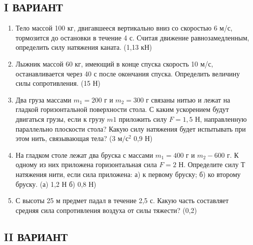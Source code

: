 \documentclass[a5paper, 10pt]{diss_4}
\renewcommand{\'}{\,'}
\begin{document}
\subsection{I ВАРИАНТ}
\begin{enumerate}

  \item Тело массой 100 кг, двигавшееся вертикально вниз со скоростью 6 м/с, тормозится до остановки в течение 4 с. Считая движение равнозамедленным, определить силу натяжения каната. (1,13 кН)

  \item Лыжник массой 60 кг, имеющий в конце спуска скорость 10 м/с, останавливается через 40 с после окончания спуска. Определить величину силы сопротивления. (15 Н)

  \item Два груза массами $m_1 = 20$0 г и $m_2 = 300$ г связаны нитью и лежат на гладкой горизонтальной поверхности стола. С каким ускорением будут двигаться грузы, если к грузу $m1$ приложить силу $F = 1,5$ Н, направленную параллельно плоскости стола? Какую силу натяжения будет испытывать при этом нить, связывающая тела? (3 $м/с^2$     0,9 Н)


  \item На гладком столе лежат два бруска с массами $m_1 = 400$ г и $m_2 - 600$ г. К одному из них приложена горизонтальная сила $F = 2$ Н. Определите силу Т натяжения нити, если сила приложена: а) к первому бруску; б) ко второму бруску. (а) 1,2 Н    б) 0,8 Н)

  \item С высоты 25 м предмет падал в течение 2,5 с. Какую часть составляет средняя сила сопротивления воздуха от силы тяжести? (0,2)

\end{enumerate}


\subsection{II ВАРИАНТ}
\end{document}
